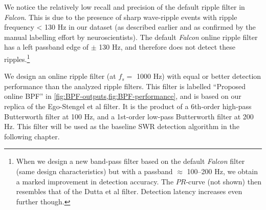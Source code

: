 \begin{figure}
\label{fig:BPF-performance}
\end{figure}

We notice the relatively low recall and precision of the default ripple filter in \emph{Falcon}. This is due to the presence of sharp wave-ripple events with ripple frequency < 130 Hz in our dataset (as described earlier and as confirmed by the manual labelling effort by neuroscientists). The default \emph{Falcon} online ripple filter has a left passband edge of $\pm$ 130 Hz, and therefore does not detect these ripples.\footnote{When we design a new band-pass filter based on the default \emph{Falcon} filter (same design characteristics) but with a passband $\approx$ 100--200 Hz, we obtain a marked improvement in detection accuracy. The $PR$-curve (not shown) then resembles that of the Dutta et al filter. Detection latency increases even further though.}

We design an online ripple filter (at $f_s = $ 1000 Hz) with equal or better detection performance than the analyzed ripple filters. This filter is labelled ``Proposed online BPF'' in \cref{fig:BPF-outputs,fig:BPF-performance}, and is based on our replica of the Ego-Stengel et al filter. It is the product of a 6th-order high-pass Butterworth filter at 100 Hz, and a 1st-order low-pass Butterworth filter at 200 Hz. This filter will be used as the baseline SWR detection algorithm in the following chapter.



